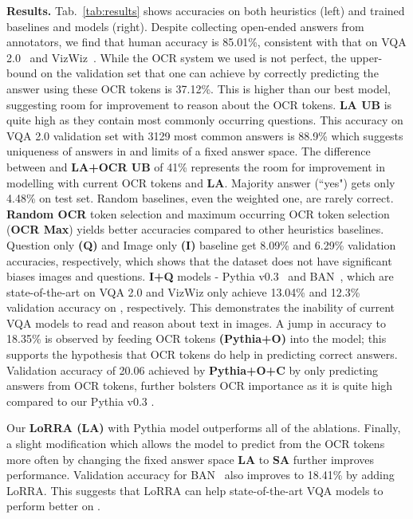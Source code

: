 \documentclass[10pt,twocolumn,letterpaper]{article}
\begin{document}
\noindent\textbf{Results.}
\label{subsec:results}
Tab.~\ref{tab:results} shows accuracies on both heuristics (left) and trained baselines and models (right). Despite collecting open-ended answers from annotators, we find that human accuracy is 85.01\%, consistent with that on VQA 2.0~\cite{balanced_vqa_v2} and VizWiz~\cite{gurari2018vizwiz}. While the OCR system we used is not perfect, the upper-bound on the validation set that one can achieve by correctly predicting the answer using these OCR tokens is 37.12\%. This is higher than our best model, suggesting room for improvement to reason about the OCR tokens. \textbf{LA UB} is quite high as they contain most commonly occurring questions.
This accuracy on VQA 2.0 validation set with 3129 most common answers is 88.9\% which suggests uniqueness of answers in \datasetName and limits of a fixed answer space.
The difference between \approachNameShort and \textbf{LA+OCR UB} of 41\% represents the room for improvement in modelling with current OCR tokens and \textbf{LA}.
Majority answer (``yes") gets only 4.48\% on test set.
Random baselines, even the weighted one, are rarely correct.
\textbf{Random OCR} token selection and maximum occurring OCR token selection (\textbf{OCR Max}) yields better accuracies compared to other heuristics baselines.
Question only \textbf{(Q)} and Image only \textbf{(I)} baseline get 8.09\% and 6.29\% validation accuracies, respectively, which shows that the dataset does not have significant biases \wrt images and questions. 
\textbf{I+Q} models - Pythia v0.3~\cite{singhpythia} and BAN~\cite{kim2018bilinear}, which
 are state-of-the-art on VQA 2.0 and VizWiz
only achieve 13.04\% and 12.3\% validation accuracy on \datasetName, respectively. 
This demonstrates the inability of current VQA models to read and reason about text in images. A  jump in accuracy to 18.35\% is observed by feeding OCR tokens \textbf{(Pythia+O)} into the model; this supports the hypothesis that OCR tokens do help in predicting correct answers. Validation accuracy of 20.06 achieved by \textbf{Pythia+O+C} by only 
predicting answers from OCR tokens, further bolsters OCR importance as it is quite high compared to our Pythia v0.3 \cite{singhpythia}. 

Our \textbf{LoRRA (LA)} with Pythia model outperforms all of the ablations. Finally, a slight modification which allows the model to predict from the OCR tokens more often by changing the fixed answer space \textbf{LA} to \textbf{SA} further improves performance. Validation accuracy for BAN~\cite{kim2018bilinear} also improves to 18.41\% by adding LoRRA. This suggests that LoRRA can help state-of-the-art VQA models to perform better on \datasetName.
\end{document}
